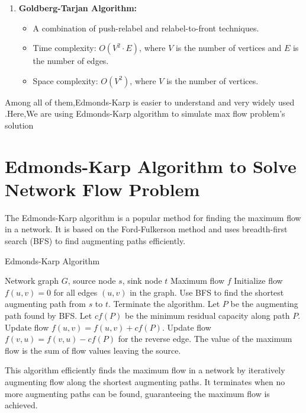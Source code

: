 \documentclass{article}
\begin{document}
\begin{enumerate}
    \item \textbf{Goldberg-Tarjan Algorithm:}
    \begin{itemize}
        \item A combination of push-relabel and relabel-to-front techniques.
        \item Time complexity: $O(V^2 \cdot E)$, where $V$ is the number of vertices and $E$ is the number of edges.
        \item Space complexity: $O(V^2)$, where $V$ is the number of vertices.
    \end{itemize}
\end{enumerate}

Among all of them,Edmonds-Karp is easier to understand and very widely used .Here,We are using Edmonds-Karp algorithm to simulate max flow problem's solution
\pagebreak
\section{Edmonds-Karp Algorithm to Solve Network Flow Problem}

The Edmonds-Karp algorithm is a popular method for finding the maximum flow in a network. It is based on the Ford-Fulkerson method and uses breadth-first search (BFS) to find augmenting paths efficiently.

\begin{algorithm}
\caption{Edmonds-Karp Algorithm}
\begin{algorithmic}[1]
\REQUIRE Network graph $G$, source node $s$, sink node $t$
\ENSURE Maximum flow $f$
\STATE Initialize flow $f(u,v) = 0$ for all edges $(u,v)$ in the graph.
    \STATE Use BFS to find the shortest augmenting path from $s$ to $t$.
        \STATE Terminate the algorithm.
    \ENDIF
    \STATE Let $P$ be the augmenting path found by BFS.
    \STATE Let $cf(P)$ be the minimum residual capacity along path $P$.
        \STATE Update flow $f(u,v) = f(u,v) + cf(P)$.
        \STATE Update flow $f(v,u) = f(v,u) - cf(P)$ for the reverse edge.
    \ENDFOR
\ENDWHILE
\STATE The value of the maximum flow is the sum of flow values leaving the source.
\end{algorithmic}
\end{algorithm}

This algorithm efficiently finds the maximum flow in a network by iteratively augmenting flow along the shortest augmenting paths. It terminates when no more augmenting paths can be found, guaranteeing the maximum flow is achieved.
\end{document}
